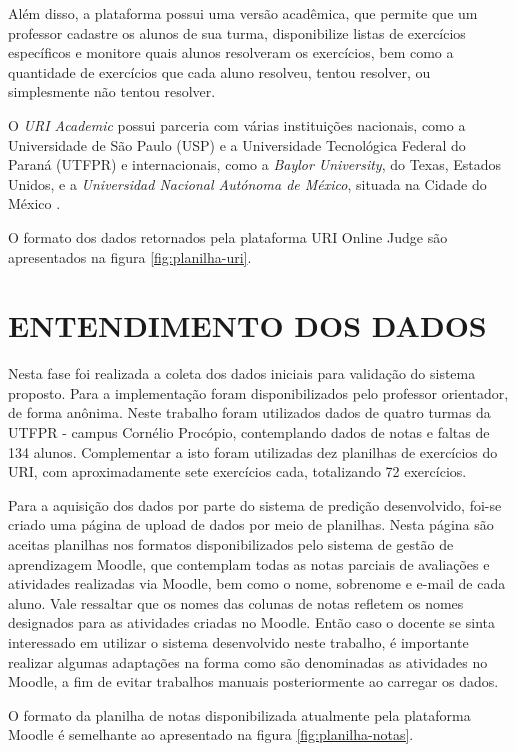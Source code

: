 Além disso, a plataforma possui uma versão acadêmica, que permite que um professor cadastre os alunos de sua turma, disponibilize listas de exercícios específicos e monitore quais alunos resolveram os exercícios, bem como a quantidade de exercícios que cada aluno resolveu, tentou resolver, ou simplesmente não tentou resolver. 

O \textit{URI Academic} possui parceria com várias instituições nacionais, como a Universidade de São Paulo (USP) e a Universidade Tecnológica Federal do Paraná (UTFPR) e internacionais, como a \textit{Baylor University}, do Texas, Estados Unidos, e a \textit{Universidad Nacional Autónoma de México}, situada na Cidade do México \cite{URIAcademic}.

O formato dos dados retornados pela plataforma URI Online Judge são apresentados na figura \ref{fig:planilha-uri}.

\section{ENTENDIMENTO DOS DADOS}
\label{sec:entendimentoDados2}

Nesta fase foi realizada a coleta dos dados iniciais para validação do sistema proposto. Para a implementação foram disponibilizados pelo professor orientador, de forma anônima. 
Neste trabalho foram utilizados dados de quatro turmas da UTFPR - campus Cornélio Procópio, contemplando dados de notas e faltas de 134 alunos.
Complementar a isto foram utilizadas dez planilhas de exercícios do URI, com aproximadamente sete exercícios cada, totalizando 72 exercícios.

Para a aquisição dos dados por parte do sistema de predição desenvolvido, foi-se criado uma página de upload de dados por meio de planilhas.
Nesta página são aceitas planilhas nos formatos disponibilizados pelo sistema de gestão de aprendizagem Moodle, que contemplam todas as notas parciais de avaliações e atividades realizadas via Moodle, bem como o nome, sobrenome e e-mail de cada aluno. 
Vale ressaltar que os nomes das colunas de notas refletem os nomes designados para as atividades criadas no Moodle. 
Então caso o docente se sinta interessado em utilizar o sistema desenvolvido neste trabalho, é importante realizar algumas adaptações na forma como são denominadas as atividades no Moodle, a fim de evitar trabalhos manuais posteriormente ao carregar os dados.

O formato da planilha de notas disponibilizada atualmente pela plataforma Moodle é semelhante ao apresentado na figura \ref{fig:planilha-notas}.

